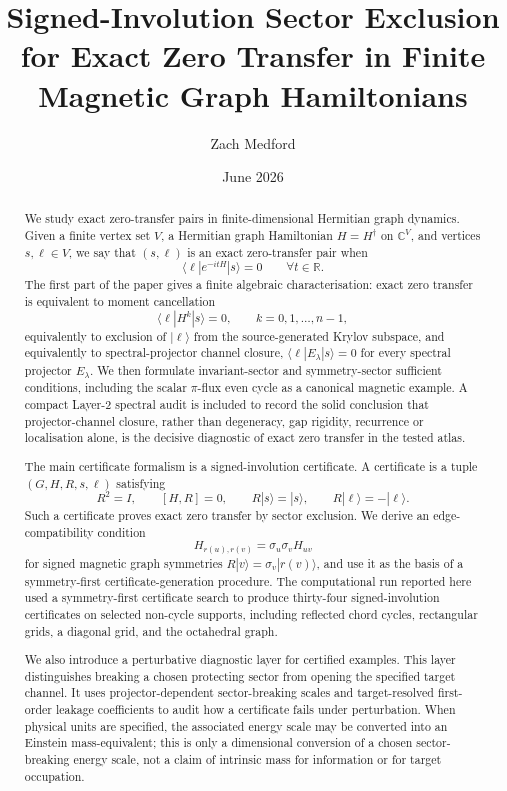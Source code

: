 \documentclass[11pt]{article}
\title{Signed-Involution Sector Exclusion for Exact Zero Transfer in Finite Magnetic Graph Hamiltonians}
\author{Zach Medford}
\date{June 2026}
\theoremstyle{definition}
\newcommand{\R}{\mathbb R}
\begin{document}
\maketitle

\begin{abstract}
We study exact zero-transfer pairs in finite-dimensional Hermitian graph dynamics. Given a finite vertex set $V$, a Hermitian graph Hamiltonian $H=H^\dagger$ on $\mathbb C^V$, and vertices $s,\ell\in V$, we say that $(s,\ell)$ is an exact zero-transfer pair when
\[
\langle \ell|e^{-itH}|s\rangle=0\qquad \forall t\in\R .
\]
The first part of the paper gives a finite algebraic characterisation: exact zero transfer is equivalent to moment cancellation
\[
\langle \ell|H^k|s\rangle=0,\qquad k=0,1,\ldots,n-1,
\]
equivalently to exclusion of $|\ell\rangle$ from the source-generated Krylov subspace, and equivalently to spectral-projector channel closure, $\langle \ell|E_\lambda|s\rangle=0$ for every spectral projector $E_\lambda$. We then formulate invariant-sector and symmetry-sector sufficient conditions, including the scalar $\pi$-flux even cycle as a canonical magnetic example. A compact Layer-2 spectral audit is included to record the solid conclusion that projector-channel closure, rather than degeneracy, gap rigidity, recurrence or localisation alone, is the decisive diagnostic of exact zero transfer in the tested atlas.

The main certificate formalism is a signed-involution certificate. A certificate is a tuple $(G,H,R,s,\ell)$ satisfying
\[
R^2=I,\qquad [H,R]=0,\qquad R|s\rangle=|s\rangle,\qquad R|\ell\rangle=-|\ell\rangle.
\]
Such a certificate proves exact zero transfer by sector exclusion. We derive an edge-compatibility condition
\[
H_{r(u),r(v)}=\sigma_u\sigma_v H_{uv}
\]
for signed magnetic graph symmetries $R|v\rangle=\sigma_v|r(v)\rangle$, and use it as the basis of a symmetry-first certificate-generation procedure. The computational run reported here used a symmetry-first certificate search to produce thirty-four signed-involution certificates on selected non-cycle supports, including reflected chord cycles, rectangular grids, a diagonal grid, and the octahedral graph.

We also introduce a perturbative diagnostic layer for certified examples. This layer distinguishes breaking a chosen protecting sector from opening the specified target channel. It uses projector-dependent sector-breaking scales and target-resolved first-order leakage coefficients to audit how a certificate fails under perturbation. When physical units are specified, the associated energy scale may be converted into an Einstein mass-equivalent; this is only a dimensional conversion of a chosen sector-breaking energy scale, not a claim of intrinsic mass for information or for target occupation.


\end{abstract}
\end{document}
